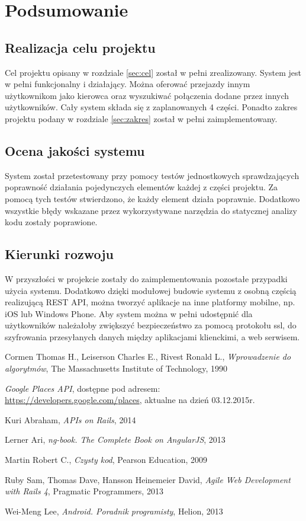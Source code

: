 \documentclass[eng,archivemode]{mgr}
\begin{document}
\chapter{Podsumowanie}
\section{Realizacja celu projektu}
Cel projektu opisany w rozdziale \ref{sec:cel} został w pełni zrealizowany. System jest w pełni funkcjonalny i działający. Można oferować przejazdy innym użytkownikom jako kierowca oraz wyszukiwać połączenia dodane przez innych użytkowników. Cały system składa się z zaplanowanych 4 części. Ponadto zakres projektu podany w rozdziale \ref{sec:zakres} został w pełni zaimplementowany.

\section{Ocena jakości systemu}
System został przetestowany przy pomocy testów jednostkowych sprawdzających poprawność działania pojedynczych elementów każdej z części projektu. Za pomocą tych testów stwierdzono, że każdy element działa poprawnie. Dodatkowo wszystkie błędy wskazane przez wykorzystywane narzędzia do statycznej analizy kodu zostały poprawione. 

\section{Kierunki rozwoju}
W przyszłości w projekcie zostały do zaimplementowania pozostałe przypadki użycia systemu. Dodatkowo dzięki modułowej budowie systemu z osobną częścią realizującą REST API, można tworzyć aplikacje na inne platformy mobilne, np. iOS lub Windows Phone. Aby system można w pełni udostępnić dla użytkowników należałoby zwiększyć bezpieczeństwo za pomocą protokołu ssl, do szyfrowania przesyłanych danych między aplikacjami klienckimi, a web serwisem.

\begin{thebibliography}{inz}
	
	Cormen Thomas H., Leiserson Charles E., Rivest Ronald L., \emph{Wprowadzenie do algorytmów}, The Massachusetts Institute of Technology, 1990
	
	\emph{Google Places API}, dostępne pod adresem:\\ \url{https://developers.google.com/places}, aktualne na dzień 03.12.2015r.
	
	Kuri Abraham, \emph{ APIs on Rails}, 2014
	
	Lerner Ari, \emph{ng-book. The Complete Book on AngularJS}, 2013
	
	Martin Robert C., \emph{Czysty kod}, Pearson Education, 2009
	
	Ruby Sam, Thomas Dave, Hansson Heinemeier David, \emph{Agile Web Development with Rails 4}, Pragmatic Programmers, 2013
	
	Wei-Meng Lee, \emph{Android. Poradnik programisty}, Helion, 2013
\end{thebibliography}
\appendix
\end{document}
